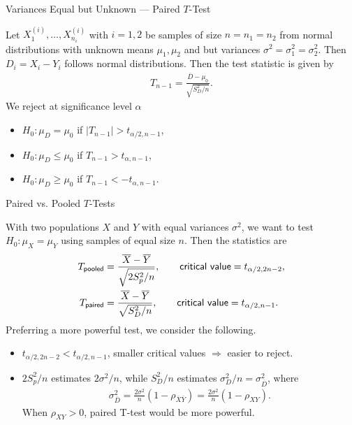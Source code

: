 \begin{frame}{Variances Equal but Unknown --- Paired $T$-Test}

\justifying
{} Let $X_1^{(i)}, \ldots, X_{n_i}^{(i)}$ with $i = 1, 2$ be samples of size $n = n_1 = n_2$ from normal distributions with unknown means $\mu_1, \mu_2$ and  but  variances $\sigma^2 = \sigma_1^2 = \sigma_2^2$. Then $D_i = X_i - Y_i$ follows normal distributions. Then the test statistic is given by
\begin{align*}
T_{n-1} = \frac{\overline{D} - \mu_0}{\sqrt{S^2_D/n}}.
\end{align*}
We reject at significance level $\alpha$
\begin{itemize}
	\item $H_0: \mu_D = \mu_0$ if $|T_{n-1}| > t_{\alpha/2,n-1}$,
	\item $H_0: \mu_D \leq \mu_0$ if $T_{n-1} > t_{\alpha,n-1}$,
	\item $H_0: \mu_D \geq \mu_0$ if $T_{n-1} < -t_{\alpha,n-1}$.
\end{itemize}


\end{frame}

\begin{frame}{Paired vs. Pooled $T$-Tests}

\justifying
With two populations $X$ and $Y$ with equal variances $\sigma^2$, we want to test $H_0: \mu_X = \mu_Y$ using samples of equal size $n$. Then the statistics are
\footnotesize
\begin{align*}
T_{\mathsf{pooled}} & = \frac{\overline{X} - \overline{Y}}{\sqrt{2S_p^2/n}}, \qquad \mathsf{critical\ value} = t_{\alpha/2,2n-2}, \\
T_{\mathsf{paired}} & = \frac{\overline{X}-\overline{Y}}{\sqrt{S_D^2/n}}, \qquad \mathsf{critical\ value} = t_{\alpha/2,n-1}.
\end{align*}
\normalsize
Preferring a more powerful test, we consider the following.
\begin{itemize}
	\justifying
	\item $t_{\alpha/2,2n-2} < t_{\alpha/2,n-1}$, smaller critical values $\Rightarrow$ easier to reject.
	\item $2S_p^2/n$ estimates $2\sigma^2/n$, while $S_D^2/n$ estimates $\sigma_D^2/n = \sigma_{\overline{D}}^2$, where
	\footnotesize
	\begin{align*}
	\sigma_{\overline{D}}^2 = \frac{2\sigma^2}{n}(1-\rho_{\overline{X}\overline{Y}}) = \frac{2\sigma^2}{n}(1-\rho_{XY}).
	\end{align*}
	\normalsize
	When $\rho_{XY} > 0$, paired T-test would be more powerful.
\end{itemize}

\end{frame}


